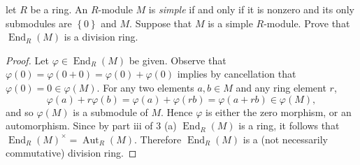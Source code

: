 \documentclass[10pt]{amsart}
\newcommand{\End}[2]{\operatorname{End}_{#1}\left(#2\right)}
\begin{document}
\begin{thm}
	let $R$ be a ring.
	An $R$-module $M$ is {\it simple} if and only if it is nonzero and its only submodules are $\left\{0\right\}$ and $M$.
	Suppose that $M$ is a simple $R$-module.
	Prove that $\End{R}{M}$ is a division ring.
	
	\begin{proof}
		Let $\varphi \in \End{R}{M}$ be given.
		Observe that $\varphi(0) = \varphi(0 + 0) = \varphi(0) + \varphi(0)$ implies by cancellation that $\varphi(0) = 0 \in \varphi(M)$.
		For any two elements $a, b \in M$ and any ring element $r$,
		$$\varphi(a) + r\varphi(b) = \varphi(a) + \varphi(rb) = \varphi(a + rb) \in \varphi(M),$$
		and so $\varphi(M)$ is a submodule of $M$.
		Hence $\varphi$ is either the zero morphism, or an automorphism.
		Since by part iii of 3 (a) $\End{R}{M}$ is a ring, it follows that $\End{R}{M}^\times = \operatorname{Aut}_R(M)$.
		Therefore $\End{R}{M}$ is a (not necessarily commutative) division ring.
	\end{proof}
\end{thm}  
\end{document}
